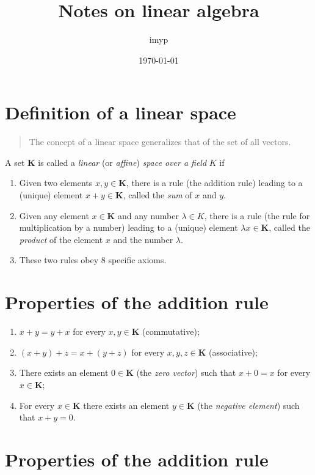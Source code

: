 \documentclass[11pt]{article}
\author{imyp}
\date{\today}
\title{Notes on linear algebra}
\begin{document}
\maketitle

\section*{Definition of a linear space}
\label{sec:org8c92a3f}
\begin{quote}
The concept of a linear space generalizes that of the set of all vectors.
\end{quote}
A set \(\mathbf{K}\) is called a \emph{linear} (or \emph{affine}) \emph{space over a
field} \(K\) if 
\begin{enumerate}
\item Given two elements \(x,y \in \mathbf{K}\), there is a rule (the
addition rule) leading to a (unique) element \(x+y\in \mathbf{K}\),
called the \emph{sum} of \(x\) and \(y\).
\item Given any element \(x\in \mathbf{K}\) and any number \(\lambda \in K\),
there is a rule (the rule for multiplication by a number) leading to
a (unique) element \(\lambda x \in \mathbf{K}\), called the \emph{product}
of the element \(x\) and the number \(\lambda\).
\item These two rules obey 8 specific axioms.
\end{enumerate}

\section*{Properties of the addition rule}
\label{sec:orga39333f}

\begin{enumerate}
\item \(x+y=y+x\) for every \(x,y\in \mathbf{K}\) (commutative);
\item \((x+y)+z=x+(y+z)\) for every \(x,y,z \in \mathbf{K}\) (associative);
\item There exists an element \(0\in \mathbf{K}\) (the \emph{zero vector}) such
that \(x+0=x\) for every \(x\in\mathbf{K}\);
\item For every \(x\in\mathbf{K}\) there exists an element \(y\in\mathbf{K}\)
(the \emph{negative element}) such that \(x+y=0\).
\end{enumerate}

\section*{Properties of the addition rule}
\label{sec:orgfd9f181}
\end{document}
